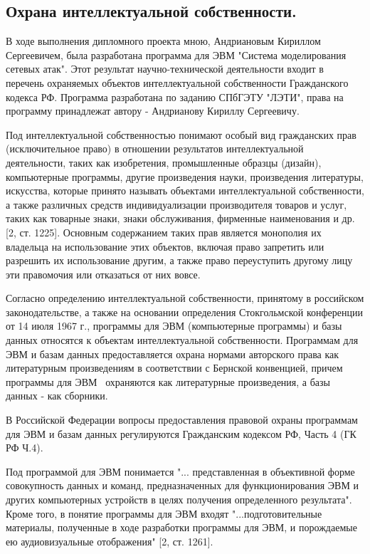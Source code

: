 

    \subsection*{Охрана интеллектуальной собственности.}

    В ходе выполнения дипломного проекта мною, Андриановым Кириллом Сергеевичем, была разработана программа для ЭВМ "Система моделирования сетевых атак". Этот результат научно-технической деятельности входит в перечень охраняемых объектов интеллектуальной собственности Гражданского кодекса РФ. Программа разработана по заданию СПбГЭТУ "ЛЭТИ", права на программу принадлежат автору - Андрианову Кириллу Сергеевичу.

    Под интеллектуальной собственностью понимают особый вид гражданских прав (исключительное право) в отношении результатов интеллектуальной деятельности, таких как изобретения, промышленные образцы (дизайн), компьютерные программы, другие произведения науки, произведения литературы, искусства, которые принято называть объектами интеллектуальной собственности, а также различных средств индивидуализации производителя товаров и услуг, таких как товарные знаки, знаки обслуживания, фирменные наименования и др. [2, ст. 1225]. Основным содержанием таких прав является монополия их владельца на использование этих объектов, включая право запретить или разрешить их использование другим, а также право переуступить другому лицу эти правомочия или отказаться от них вовсе.

    Согласно определению интеллектуальной собственности, принятому в российском законодательстве, а также на основании определения Стокгольмской конференции от 14 июля 1967 г., программы для ЭВМ (компьютерные программы) и базы данных относятся к объектам интеллектуальной собственности. Программам для ЭВМ и базам данных предоставляется охрана нормами авторского права как литературным произведениям в соответствии с Бернской конвенцией, причем программы для ЭВМ \
    охраняются как литературные произведения, а базы данных - как сборники.

    В Российской Федерации вопросы предоставления правовой охраны программам для ЭВМ и базам данных регулируются Гражданским кодексом РФ, Часть 4 (ГК РФ Ч.4).

    Под программой для ЭВМ понимается "... представленная в объективной форме совокупность данных и команд, предназначенных для функционирования ЭВМ и других компьютерных устройств в целях получения определенного результата". Кроме того, в понятие программы для ЭВМ входят "...подготовительные материалы, полученные в ходе разработки программы для ЭВМ, и порождаемые ею аудиовизуальные отображения" [2, ст. 1261].


